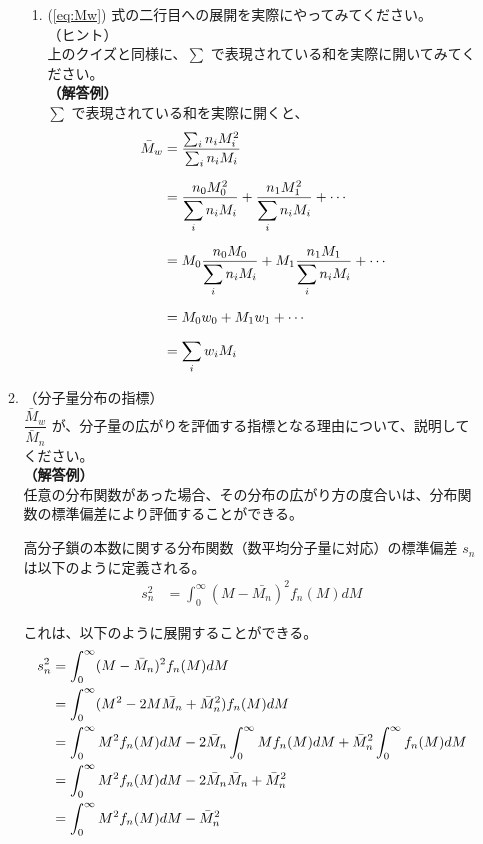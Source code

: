 \documentclass[uplatex,dvipdfmx,a4paper,11pt, titlepage]{jsarticle}
\begin{document}
\begin{itemize}
\begin{enumerate}
\begin{enumerate}
		\item
		(\ref{eq:Mw}) 式の二行目への展開を実際にやってみてください。\\
		（ヒント）\\
		上のクイズと同様に、$\sum$ で表現されている和を実際に開いてみてください。\\
		{\bf（解答例）}\\
		$\sum$ で表現されている和を実際に開くと、
		\begin{align*}
		{\bar M}_w 
			&= \dfrac{\sum_i n_i M_i^2}{\sum_i n_i M_i}\notag \\[6pt]
			&= \dfrac{n_0 M_0^2}{\displaystyle \sum_i n_i M_i} + \dfrac{n_1 M_1^2}{\displaystyle \sum_i n_i M_i} + \cdots \notag \\[6pt]
			&= M_0 \dfrac{n_0 M_0}{\displaystyle \sum_i n_i M_i} + M_1 \dfrac{n_1 M_1}{\displaystyle \sum_i n_i M_i} + \cdots \notag \\[6pt]
			&= M_0 w_0 + M_1 w_1 + \cdots \notag \\[6pt]
			&= \displaystyle \sum_i w_i M_i
		\end{align*}
		\end{enumerate}
	\item
	（分子量分布の指標）\\
	$\dfrac{\bar{M}_w}{\bar{M}_n}$ が、分子量の広がりを評価する指標となる理由について、説明してください。\\
	{\bf（解答例）}\\
	任意の分布関数があった場合、その分布の広がり方の度合いは、分布関数の標準偏差により評価することができる。

	高分子鎖の本数に関する分布関数（数平均分子量に対応）の標準偏差 $s_n$ は以下のように定義される。
	\begin{align}
	s_n^2
		&= \displaystyle \int_0^{\infty}(M - \bar{M_n})^2 f_n(M) dM
	\end{align}

	これは、以下のように展開することができる。
	\begin{align}
	s_n^2
		&= \displaystyle \int_0^{\infty}(M - \bar{M}_n)^2 f_n(M) dM \notag \\
		&= \displaystyle \int_0^{\infty}(M^2 - 2M \bar{M_n} + \bar{M}_n^2) f_n(M) dM \notag \\
		&= \displaystyle \int_0^{\infty} M^2 f_n(M) dM - 2 \bar{M}_n \displaystyle \int_0^{\infty} M f_n(M) dM + \bar{M}_n^2 \displaystyle \int_0^{\infty} 
			f_n(M) dM \notag \\
		&= \displaystyle \int_0^{\infty} M^2 f_n(M) dM - 2 \bar{M}_n \bar{M}_n + \bar{M}_n^2  \notag \\
		&= \displaystyle \int_0^{\infty} M^2 f_n(M) dM - \bar{M}_n^2
	\end{align}


\end{enumerate}
\end{itemize}
\end{document}
